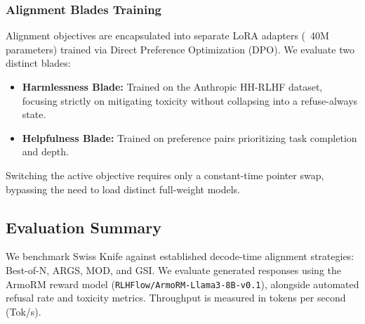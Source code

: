 \documentclass[letterpaper]{article} %
\begin{document}
\subsubsection{Alignment Blades Training}
Alignment objectives are encapsulated into separate LoRA adapters (~40M parameters) trained via Direct Preference Optimization (DPO). We evaluate two distinct blades:
\begin{itemize}
    \item \textbf{Harmlessness Blade:} Trained on the Anthropic HH-RLHF dataset, focusing strictly on mitigating toxicity without collapsing into a refuse-always state.
    \item \textbf{Helpfulness Blade:} Trained on preference pairs prioritizing task completion and depth. 
\end{itemize}
Switching the active objective requires only a constant-time pointer swap, bypassing the need to load distinct full-weight models.

\subsection{Evaluation Summary}

We benchmark Swiss Knife against established decode-time alignment strategies: Best-of-N, ARGS, MOD, and GSI. We evaluate generated responses using the ArmoRM reward model (\texttt{RLHFlow/ArmoRM-Llama3-8B-v0.1}), alongside automated refusal rate and toxicity metrics. Throughput is measured in tokens per second (Tok/s).

\begin{table}[h]
\centering
{}
\caption{Evaluation Summary across alignment strategies. Swiss Knife achieves superior helpfulness and harmlessness scores while resisting the over-refusal degeneration commonly seen in token-level steering methods.}
\label{tab:evaluation_summary}
\end{table}
\end{document}
